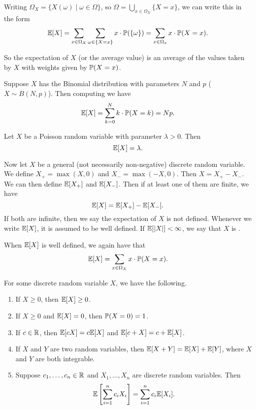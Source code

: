 \documentclass[a4paper]{scrreprt}
\begin{document}
Writing $\Omega_X = \{X(\omega) \mid \omega \in \Omega \}$, so $\Omega = \bigcup_{x \in \Omega_X} \{X = x\}$, we can write this in the form
$$
\mathbb{E}[X] = \sum_{x \in \Omega_X} \sum_{\omega \in \{X = x\}} x \cdot \mathbb{P} (\{\omega\}) = \sum_{x \in \Omega_x} x \cdot \mathbb{P}(X = x).
$$

So the expectation of $X$ (or the average value) is an average of the values taken by $X$ with weights given by $\mathbb{P}(X = x)$.

\begin{example}
	Suppose $X$ has the Binomial distribution with parameters $N$ and $p$ ($X \sim B(N, p)$). Then computing we have
	$$
	\mathbb{E}[X]= \sum_{k = 0}^N k \cdot \mathbb{P}(X = k) = Np.
	$$
\end{example}

\begin{example}
	Let $X$ be a Poisson random variable with parameter $\lambda > 0$. Then 
	$$
	\mathbb{E}[X] = \lambda.
	$$
\end{example}

Now let $X$ be a general (not necessarily non-negative) discrete random variable. We define $X_+ = \max(X, 0)$ and $X_- = \max(-X, 0)$. Then $X = X_+ - X_-$. We can then define $\mathbb{E}[X_+]$ and $\mathbb{E}[X_-]$. Then if at least one of them are finite, we have
$$
	\mathbb{E}[X] = \mathbb{E}[X_+] - \mathbb{E}[X_-].
$$
If both are infinite, then we say the expectation of $X$ is not defined. Whenever we write $\mathbb{E}[X]$, it is assumed to be well defined. If $\mathbb{E}[|X|] < \infty$, we say that $X$ is .

When $\mathbb{E}[X]$ is well defined, we again have that
$$
\mathbb{E}[X] = \sum_{x \in \Omega_X} x \cdot \mathbb{P}(X = x).
$$

\begin{proposition}
For some discrete random variable $X$, we have the following.
\begin{enumerate}[label=(\roman*)]
	\item If $X \geq 0$, then $\mathbb{E}[X] \geq 0$.
	\item If $X \geq 0$ and $\mathbb{E}[X] = 0$, then $\mathbb{P}(X = 0) = 1$.
	\item If $c \in \mathbb{R}$, then $\mathbb{E}[cX] = c\mathbb{E}[X]$ and $\mathbb{E}[c + X] = c + \mathbb{E}[X]$.
	\item If $X$ and $Y$ are two random variables, then $\mathbb{E}[X + Y] = \mathbb{E}[X] + \mathbb{E}[Y]$, where $X$ and $Y$ are both integrable.
	\item Suppose $c_1, \dots, c_n \in \mathbb{R}$ and $X_1, \dots, X_n$ are discrete random variables. Then
	$$
	\mathbb{E}\left[\sum_{i = 1}^n c_i X_i\right] = \sum_{i = 1}^n c_i \mathbb{E}[X_i].
	$$
\end{enumerate}
\end{proposition}
\end{document}
